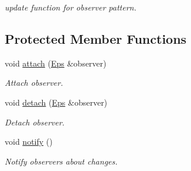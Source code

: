 \begin{DoxyCompactItemize}
\begin{DoxyCompactList}\small\item\em update function for observer pattern. \end{DoxyCompactList}\end{DoxyCompactItemize}
\subsection*{Protected Member Functions}
\begin{DoxyCompactItemize}
\item 
\hypertarget{classSpacy_1_1Mixin_1_1MixinConnection_abb5520ee6b22dd993d78f142939a1ed4}{}void \hyperlink{classSpacy_1_1Mixin_1_1MixinConnection_abb5520ee6b22dd993d78f142939a1ed4}{attach} (\hyperlink{classSpacy_1_1Mixin_1_1Eps_a51dbe0b9cc950e0f3dfd34a481f08ae4_a51dbe0b9cc950e0f3dfd34a481f08ae4}{Eps} \&observer)\label{classSpacy_1_1Mixin_1_1MixinConnection_abb5520ee6b22dd993d78f142939a1ed4}

\begin{DoxyCompactList}\small\item\em Attach observer. \end{DoxyCompactList}\item 
\hypertarget{classSpacy_1_1Mixin_1_1MixinConnection_adda739590c487679c26f60e50aedb73f}{}void \hyperlink{classSpacy_1_1Mixin_1_1MixinConnection_adda739590c487679c26f60e50aedb73f}{detach} (\hyperlink{classSpacy_1_1Mixin_1_1Eps_a51dbe0b9cc950e0f3dfd34a481f08ae4_a51dbe0b9cc950e0f3dfd34a481f08ae4}{Eps} \&observer)\label{classSpacy_1_1Mixin_1_1MixinConnection_adda739590c487679c26f60e50aedb73f}

\begin{DoxyCompactList}\small\item\em Detach observer. \end{DoxyCompactList}\item 
\hypertarget{classSpacy_1_1Mixin_1_1MixinConnection_a1ddeaa78a3bb4a38c2cca36d1f99fe36}{}void \hyperlink{classSpacy_1_1Mixin_1_1MixinConnection_a1ddeaa78a3bb4a38c2cca36d1f99fe36}{notify} ()\label{classSpacy_1_1Mixin_1_1MixinConnection_a1ddeaa78a3bb4a38c2cca36d1f99fe36}

\begin{DoxyCompactList}\small\item\em Notify observers about changes. \end{DoxyCompactList}\end{DoxyCompactItemize}

